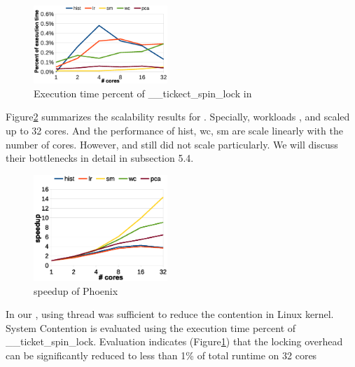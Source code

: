 \begin{figure}[!h!t]  
	\centering
	\includegraphics[width=0.45\textwidth]{eps/dmr_spinlock.eps}
	\caption{Execution time percent of \_\_tickect\_spin\_lock in \myds}
	\label{fig:smr:spinlock}
\end{figure}

Figure\ref{fig:smr:speedup} summarizes the scalability results for \myds.
Specially, workloads ,  and  scaled up to 32 cores.
And the performance of hist, wc, sm are scale linearly with the number of cores.
However,  and  still did not scale particularly. 
We will discuss their bottlenecks in detail in subsection 5.4.
\begin{figure}[!h!t]  
	\centering
	\includegraphics[width=0.45\textwidth]{eps/dmr_speedup.eps}
	\caption{speedup of Phoenix}
	\label{fig:smr:speedup}
\end{figure}

In our \myds, using \myth thread was sufficient to reduce the contention in Linux kernel. 
System Contention is evaluated using the execution time percent of \_\_ticket\_spin\_lock. 
Evaluation indicates (Figure\ref{fig:smr:spinlock}) that the locking overhead can be significantly reduced to less than 1\% of total runtime on 32 cores


